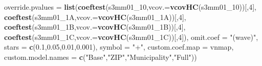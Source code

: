\documentclass[
]{article}
\newenvironment{Shaded}{\begin{snugshade}}{\end{snugshade}}
\newcommand{\DataTypeTok}[1]{\textcolor[rgb]{0.13,0.29,0.53}{#1}}
\newcommand{\DecValTok}[1]{\textcolor[rgb]{0.00,0.00,0.81}{#1}}
\newcommand{\FloatTok}[1]{\textcolor[rgb]{0.00,0.00,0.81}{#1}}
\newcommand{\KeywordTok}[1]{\textcolor[rgb]{0.13,0.29,0.53}{\textbf{#1}}}
\newcommand{\NormalTok}[1]{#1}
\newcommand{\StringTok}[1]{\textcolor[rgb]{0.31,0.60,0.02}{#1}}
\begin{document}
\begin{Shaded}
\begin{Highlighting}[]
          \DataTypeTok{override.pvalues =} \KeywordTok{list}\NormalTok{(}\KeywordTok{coeftest}\NormalTok{(s3mm01_}\DecValTok{10}\NormalTok{,}\DataTypeTok{vcov.=}\KeywordTok{vcovHC}\NormalTok{(s3mm01_}\DecValTok{10}\NormalTok{))[,}\DecValTok{4}\NormalTok{],}
                                  \KeywordTok{coeftest}\NormalTok{(s3mm01_1A,}\DataTypeTok{vcov.=}\KeywordTok{vcovHC}\NormalTok{(s3mm01_1A))[,}\DecValTok{4}\NormalTok{],}
                                  \KeywordTok{coeftest}\NormalTok{(s3mm01_1B,}\DataTypeTok{vcov.=}\KeywordTok{vcovHC}\NormalTok{(s3mm01_1B))[,}\DecValTok{4}\NormalTok{],}
                                  \KeywordTok{coeftest}\NormalTok{(s3mm01_1C,}\DataTypeTok{vcov.=}\KeywordTok{vcovHC}\NormalTok{(s3mm01_1C))[,}\DecValTok{4}\NormalTok{]),}
          \DataTypeTok{omit.coef =} \StringTok{"(wave)"}\NormalTok{, }\DataTypeTok{stars =} \KeywordTok{c}\NormalTok{(}\FloatTok{0.1}\NormalTok{,}\FloatTok{0.05}\NormalTok{,}\FloatTok{0.01}\NormalTok{,}\FloatTok{0.001}\NormalTok{), }\DataTypeTok{symbol =} \StringTok{"+"}\NormalTok{,}
          \DataTypeTok{custom.coef.map =}\NormalTok{ vnmap, }
          \DataTypeTok{custom.model.names =} \KeywordTok{c}\NormalTok{(}\StringTok{"Base"}\NormalTok{,}\StringTok{"ZIP"}\NormalTok{,}\StringTok{"Municipality"}\NormalTok{,}\StringTok{"Full"}\NormalTok{))}
\end{Highlighting}
\end{Shaded}
\end{document}
